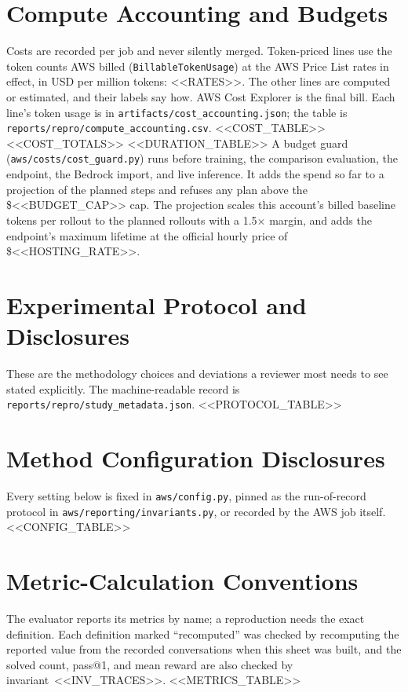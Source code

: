 \documentclass[11pt]{article}
\begin{document}
\section{Compute Accounting and Budgets}
Costs are recorded per job and never silently merged. Token-priced lines use the token counts AWS billed
(\texttt{BillableTokenUsage}) at the AWS Price List rates in effect, in USD per million tokens: <<RATES>>.
The other lines are computed or estimated, and their labels say how. AWS Cost Explorer is the final bill.
Each line's token usage is in \texttt{artifacts/cost\_accounting.json}; the table is
\texttt{reports/repro/compute\_accounting.csv}.
<<COST_TABLE>>
<<COST_TOTALS>>
<<DURATION_TABLE>>
A budget guard (\texttt{aws/costs/cost\_guard.py}) runs before training, the comparison evaluation, the
endpoint, the Bedrock import, and live inference. It adds the spend so far to a projection of the planned
steps and refuses any plan above the \$<<BUDGET_CAP>> cap. The projection scales this account's billed
baseline tokens per rollout to the planned rollouts with a 1.5$\times$ margin, and adds the endpoint's
maximum lifetime at the official hourly price of \$<<HOSTING_RATE>>.

\section{Experimental Protocol and Disclosures}
These are the methodology choices and deviations a reviewer most needs to see stated explicitly. The
machine-readable record is \texttt{reports/repro/study\_metadata.json}.
<<PROTOCOL_TABLE>>

\section{Method Configuration Disclosures}
Every setting below is fixed in \texttt{aws/config.py}, pinned as the run-of-record protocol in
\texttt{aws/reporting/invariants.py}, or recorded by the AWS job itself.
<<CONFIG_TABLE>>

\section{Metric-Calculation Conventions}
The evaluator reports its metrics by name; a reproduction needs the exact definition. Each definition marked
``recomputed'' was checked by recomputing the reported value from the recorded conversations when this sheet
was built, and the solved count, pass@1, and mean reward are also checked by invariant~<<INV_TRACES>>.
<<METRICS_TABLE>>
\end{document}
